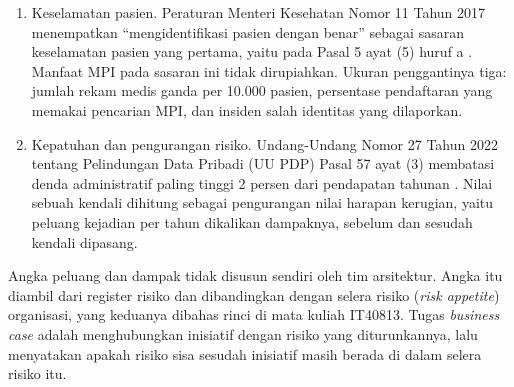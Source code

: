 \begin{enumerate}
  \item Keselamatan pasien. Peraturan Menteri Kesehatan Nomor 11 Tahun 2017
        menempatkan ``mengidentifikasi pasien dengan benar'' sebagai sasaran
        keselamatan pasien yang pertama, yaitu pada Pasal 5 ayat (5) huruf a
        \cite{c13-permenkes11-2017}. Manfaat MPI pada sasaran ini tidak
        dirupiahkan. Ukuran penggantinya tiga: jumlah rekam medis ganda per
        10.000 pasien, persentase pendaftaran yang memakai pencarian MPI, dan
        insiden salah identitas yang dilaporkan.
  \item Kepatuhan dan pengurangan risiko. Undang-Undang Nomor 27 Tahun 2022
        tentang Pelindungan Data Pribadi (UU PDP) Pasal 57 ayat (3) membatasi
        denda administratif paling tinggi 2 persen dari pendapatan tahunan
        \cite{uu27-2022-pdp}. Nilai sebuah kendali dihitung sebagai
        pengurangan nilai harapan kerugian, yaitu peluang kejadian per tahun
        dikalikan dampaknya, sebelum dan sesudah kendali dipasang.
\end{enumerate}

Angka peluang dan dampak tidak disusun sendiri oleh tim arsitektur. Angka itu
diambil dari register risiko dan dibandingkan dengan selera risiko
(\textit{risk appetite}) organisasi, yang keduanya dibahas rinci di mata
kuliah IT40813. Tugas \textit{business case} adalah menghubungkan inisiatif
dengan risiko yang diturunkannya, lalu menyatakan apakah risiko sisa sesudah
inisiatif masih berada di dalam selera risiko itu.

